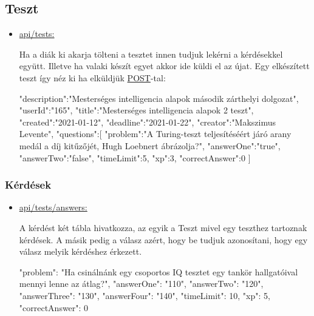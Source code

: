 \subsection{Teszt}
\begin{itemize}[label={$\bullet$}, topsep=0pt, itemsep=0pt, leftmargin=15pt]
    \item[] {\url{api/tests:}}
          \begin{addmargin}[\parindent]{0pt}
              Ha a diák ki akarja tölteni a tesztet innen tudjuk lekérni a kérdésekkel együtt. Illetve ha valaki készít egyet akkor ide küldi el az újat.
              Egy elkészített teszt így néz ki ha elküldjük \url{POST}-tal:
              \begin{json}
{
    "description":"Mesterséges intelligencia alapok második zárthelyi dolgozat",
    "userId":"165",
    "title":"Mesterséges intelligencia alapok 2 teszt",
    "created":"2021-01-12",
    "deadline":"2021-01-22",
    "creator":"Makszimus Levente",
    "questions":[
        {
            "problem":"A Turing-teszt teljesítéséért járó arany medál a díj kitűzőjét, Hugh Loebnert ábrázolja?",
            "answerOne":"true",
            "answerTwo":"false",
            "timeLimit":5,
            "xp":3,
            "correctAnswer":0
        }
    ]
}
              \end{json}
          \end{addmargin}
\end{itemize}

\subsubsection{Kérdések}
\begin{itemize}[label={$\bullet$}, topsep=0pt, itemsep=0pt, leftmargin=15pt]
    \item[] {\url{api/tests/answers:}}
          \begin{addmargin}[\parindent]{0pt}
              A kérdést két tábla hivatkozza, az egyik a Teszt mivel egy teszthez tartoznak kérdések. A másik pedig a válasz azért, hogy be tudjuk azonosítani, hogy egy válasz melyik kérdéshez érkezett.
              \begin{json}
{
    "problem": "Ha csinálnánk egy csoportos IQ tesztet egy tankör hallgatóival mennyi lenne az átlag?",
    "answerOne": "110",
    "answerTwo": "120",
    "answerThree": "130",
    "answerFour": "140",
    "timeLimit": 10,
    "xp": 5,
    "correctAnswer": 0
}
              \end{json}
          \end{addmargin}
\end{itemize}

